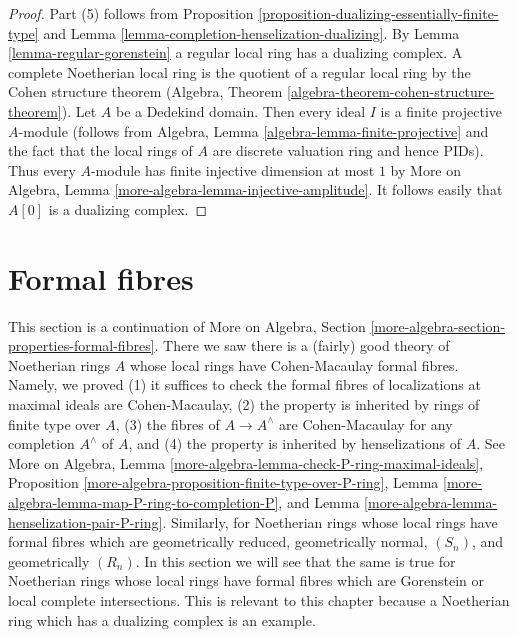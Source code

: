 \begin{proof}
Part (5) follows from Proposition
\ref{proposition-dualizing-essentially-finite-type}
and Lemma \ref{lemma-completion-henselization-dualizing}.
By Lemma \ref{lemma-regular-gorenstein} a regular local ring has a
dualizing complex.
A complete Noetherian local ring is the quotient of a regular
local ring by the Cohen structure theorem
(Algebra, Theorem \ref{algebra-theorem-cohen-structure-theorem}).
Let $A$ be a Dedekind domain. Then every ideal $I$ is a finite
projective $A$-module (follows from
Algebra, Lemma \ref{algebra-lemma-finite-projective}
and the fact that the local rings of $A$ are discrete valuation ring
and hence PIDs). Thus every $A$-module has finite injective dimension
at most $1$ by
More on Algebra, Lemma \ref{more-algebra-lemma-injective-amplitude}.
It follows easily that $A[0]$ is a dualizing complex.
\end{proof}





\section{Formal fibres}
\label{section-formal-fibres}

\noindent
This section is a continuation of
More on Algebra, Section \ref{more-algebra-section-properties-formal-fibres}.
There we saw there is a (fairly) good theory of Noetherian rings $A$
whose local rings have Cohen-Macaulay formal fibres. Namely, we proved
(1) it suffices to check the formal fibres of localizations at
maximal ideals are Cohen-Macaulay,
(2) the property is inherited by rings of finite type over $A$,
(3) the fibres of $A \to A^\wedge$ are Cohen-Macaulay for
any completion $A^\wedge$ of $A$, and
(4) the property is inherited by henselizations of $A$. See
More on Algebra, Lemma \ref{more-algebra-lemma-check-P-ring-maximal-ideals},
Proposition \ref{more-algebra-proposition-finite-type-over-P-ring},
Lemma \ref{more-algebra-lemma-map-P-ring-to-completion-P}, and
Lemma \ref{more-algebra-lemma-henselization-pair-P-ring}.
Similarly, for Noetherian rings whose local rings have formal fibres
which are geometrically reduced, geometrically normal, $(S_n)$, and
geometrically $(R_n)$.
In this section we will see that the same is true for Noetherian rings
whose local rings have formal fibres which are Gorenstein
or local complete intersections.
This is relevant to this chapter because a Noetherian ring which has a
dualizing complex is an example.

